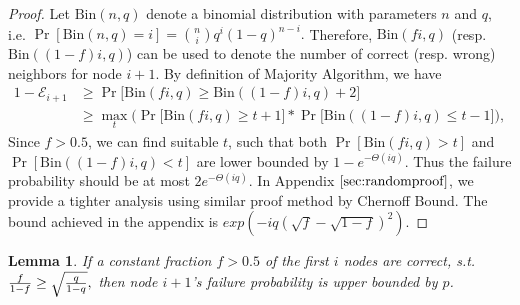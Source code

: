 \documentclass[a4paper,UKenglish]{lipics}
\newtheorem{lem}[thm]{Lemma}
\theoremstyle{definition}
\begin{document}
\begin{proof}
Let $\text{Bin}(n,q)$ denote a binomial distribution with parameters $n$ and $q$, i.e.
$
	\Pr[\text{Bin}(n, q) = i]
=
	{n\choose i} q^{i}(1-q)^{n-i}.
$
Therefore, $\text{Bin}(fi, q)$ (resp. $\text{Bin}((1-f)i, q)$) can be used to denote the number of correct (resp. wrong) neighbors for node $i+1$.
By definition of Majority Algorithm, we have
\begin{align*}
	1 - \mathcal{E}_{i+1}
& \ge
	\Pr\Big[ 
		\text{Bin}(fi, q) \ge \text{Bin}((1-f)i, q) + 2 
	\Big]
\\
& \ge
	\max_{t} \Big(
		\Pr \Big[ 
			\text{Bin}(fi, q) \ge t + 1
		\Big]
		* 	
		\Pr\Big[ 
			\text{Bin}((1-f)i, q) \le t - 1
		\Big]
	\Big),
\end{align*}
Since $f > 0.5$, we can find suitable $t$, 
	such that both $\Pr[ \text{Bin}(fi, q) > t]$ and $\Pr[ \text{Bin}((1-f)i, q) < t]$ are lower bounded by $1 - e^{-\Theta(iq)}$.
Thus the failure probability should be at most $2e^{-\Theta(iq)}$.
In Appendix $\ref{sec:randomproof}$, we provide a tighter analysis using similar proof method by Chernoff Bound.
The bound achieved in the appendix is $exp({-iq(\sqrt{f} - \sqrt{1-f})^2})$.
\end{proof}

\begin{lem}
\label {lem:simplefailurefori}
If a constant fraction $f > 0.5$ of the first $i$ nodes are correct, s.t.
$
	{f\over 1-f} \ge \sqrt{q\over 1-q},
$
then node $i+1$'s failure probability is upper bounded by $p$. 
\end{lem}
\end{document}
